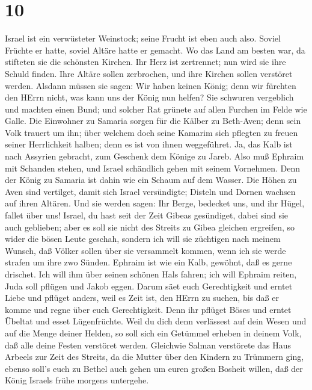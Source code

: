 \hypertarget{section-9}{%
\section{10}\label{section-9}}

 Israel ist ein verwüsteter Weinstock; seine Frucht ist eben
auch also. Soviel Früchte er hatte, soviel Altäre hatte er gemacht. Wo
das Land am besten war, da stifteten sie die schönsten Kirchen.
 Ihr Herz ist zertrennet; nun wird sie ihre Schuld finden.
Ihre Altäre sollen zerbrochen, und ihre Kirchen sollen verstöret werden.
 Alsdann müssen sie sagen: Wir haben keinen König; denn wir
fürchten den HErrn nicht, was kann uns der König nun helfen?
 Sie schwuren vergeblich und machten einen Bund; und solcher
Rat grünete auf allen Furchen im Felde wie Galle.  Die
Einwohner zu Samaria sorgen für die Kälber zu Beth-Aven; denn sein Volk
trauert um ihn; über welchem doch seine Kamarim sich pflegten zu freuen
seiner Herrlichkeit halben; denn es ist von ihnen weggeführet.
 Ja, das Kalb ist nach Assyrien gebracht, zum Geschenk dem
Könige zu Jareb. Also muß Ephraim mit Schanden stehen, und Israel
schändlich gehen mit seinem Vornehmen.  Denn der König zu
Samaria ist dahin wie ein Schaum auf dem Wasser.  Die Höhen
zu Aven sind vertilget, damit sich Israel versündigte; Disteln und
Dornen wachsen auf ihren Altären. Und sie werden sagen: Ihr Berge,
bedecket uns, und ihr Hügel, fallet über uns!  Israel, du
hast seit der Zeit Gibeas gesündiget, dabei sind sie auch geblieben;
aber es soll sie nicht des Streits zu Gibea gleichen ergreifen, so wider
die bösen Leute geschah,  sondern ich will sie züchtigen
nach meinem Wunsch, daß Völker sollen über sie versammelt kommen, wenn
ich sie werde strafen um ihre zwo Sünden.  Ephraim ist wie
ein Kalb, gewöhnt, daß es gerne drischet. Ich will ihm über seinen
schönen Hals fahren; ich will Ephraim reiten, Juda soll pflügen und
Jakob eggen.  Darum säet euch Gerechtigkeit und erntet
Liebe und pflüget anders, weil es Zeit ist, den HErrn zu suchen, bis daß
er komme und regne über euch Gerechtigkeit.  Denn ihr
pflüget Böses und erntet Übeltat und esset Lügenfrüchte. 
Weil du dich denn verlässest auf dein Wesen und auf die Menge deiner
Helden, so soll sich ein Getümmel erheben in deinem Volk, daß alle deine
Festen verstöret werden. Gleichwie Salman verstörete das Haus Arbeels
zur Zeit des Streits, da die Mutter über den Kindern zu Trümmern ging,
 ebenso soll's euch zu Bethel auch gehen um euren großen
Bosheit willen, daß der König Israels frühe morgens untergehe.

